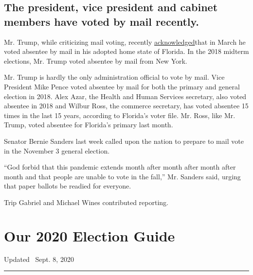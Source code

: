 \hypertarget{the-president-vice-president-and-cabinet-members-have-voted-by-mail-recently}{%
\subsection{The president, vice president and cabinet members have voted
by mail
recently.}\label{the-president-vice-president-and-cabinet-members-have-voted-by-mail-recently}}

Mr. Trump, while criticizing mail voting, recently
\href{https://twitter.com/MSNBC/status/1247658663617138691?s=20}{acknowledged}that
in March he voted absentee by mail in his adopted home state of Florida.
In the 2018 midterm elections, Mr. Trump voted absentee by mail from New
York.

Mr. Trump is hardly the only administration official to vote by mail.
Vice President Mike Pence voted absentee by mail for both the primary
and general election in 2018. Alex Azar, the Health and Human Services
secretary, also voted absentee in 2018 and Wilbur Ross, the commerce
secretary, has voted absentee 15 times in the last 15 years, according
to Florida's voter file. Mr. Ross, like Mr. Trump, voted absentee for
Florida's primary last month.

Senator Bernie Sanders last week called upon the nation to prepare to
mail vote in the November 3 general election.

``God forbid that this pandemic extends month after month after month
after month and that people are unable to vote in the fall,'' Mr.
Sanders said, urging that paper ballots be readied for everyone.

Trip Gabriel and Michael Wines contributed reporting.

\hypertarget{our-2020-election-guide}{%
\section{Our 2020 Election Guide}\label{our-2020-election-guide}}

Updated ~Sept. 8, 2020

\begin{center}\rule{0.5\linewidth}{\linethickness}\end{center}

